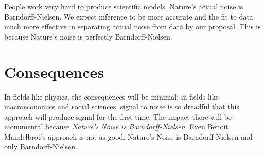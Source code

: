 \documentclass{amsart}
\begin{document}
People work very hard to produce scientific models.  Nature's actual noise is Barndorff-Nielsen.  We expect inference to be more accurate and the fit to data much more effective in separating actual noise from data by our proposal.  This is because Nature's noise is perfectly Barndorff-Nielsen.

\section{Consequences}
In fields like physics, the consequences will be minimal; in fields like macroeconomics and social sciences, signal to noise is so dreadful that this approach will produce signal for the first time.  The impact there will be monumental because {\em Nature's Noise is Barndorff-Nielsen}.  Even Benoit Mandelbrot's approach is not as good.  Nature's Noise is Barndorff-Nielsen and only Barndorff-Nielsen.
\end{document}
